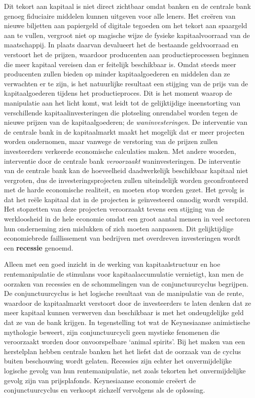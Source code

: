 \documentclass[
  a5paper,
  smalldemyvopaper,11pt,twoside,onecolumn,openright,extrafontsizes,
hidelinks]{memoir}
\begin{document}
Dit tekort aan kapitaal is niet direct zichtbaar omdat banken en de
centrale bank genoeg fiduciaire middelen kunnen uitgeven voor alle
leners. Het creëren van nieuwe biljetten aan papiergeld of digitale
tegoeden om het tekort aan spaargeld aan te vullen, vergroot niet op
magische wijze de fysieke kapitaalvoorraad van de maatschappij. In
plaats daarvan devalueert het de bestaande geldvoorraad en verstoort het
de prijzen, waardoor producenten aan productieprocessen beginnen die
meer kapitaal vereisen dan er feitelijk beschikbaar is. Omdat steeds
meer producenten zullen bieden op minder kapitaalgoederen en middelen
dan ze verwachten er te zijn, is het natuurlijke resultaat een stijging
van de prijs van de kapitaalgoederen tijdens het productieproces. Dit is
het moment waarop de manipulatie aan het licht komt, wat leidt tot de
gelijktijdige ineenstorting van verschillende kapitaalinvesteringen die
plotseling onrendabel worden tegen de nieuwe prijzen van de
kapitaalgoederen; de \emph{waninvesteringen}. De interventie van de
centrale bank in de kapitaalmarkt maakt het mogelijk dat er meer
projecten worden ondernomen, maar vanwege de verstoring van de prijzen
zullen investeerders verkeerde economische calculaties maken. Met andere
woorden, interventie door de centrale bank \emph{veroorzaakt}
waninvesteringen. De interventie van de centrale bank kan de hoeveelheid
daadwerkelijk beschikbaar kapitaal niet vergroten, dus de
investeringsprojecten zullen uiteindelijk worden geconfronteerd met de
harde economische realiteit, en moeten stop worden gezet. Het gevolg is
dat het reële kapitaal dat in de projecten is geïnvesteerd onnodig wordt
verspild. Het stopzetten van deze projecten veroorzaakt tevens een
stijging van de werkloosheid in de hele economie omdat een groot aantal
mensen in veel sectoren hun onderneming zien mislukken of zich moeten
aanpassen. Dit gelijktijdige economiebrede faillissement van bedrijven
met overdreven investeringen wordt een \textbf{recessie} genoemd.

Alleen met een goed inzicht in de werking van kapitaalstructuur en hoe
rentemanipulatie de stimulans voor kapitaalaccumulatie vernietigt, kan
men de oorzaken van recessies en de schommelingen van de
conjunctuurcyclus begrijpen. De conjunctuurcyclus is het logische
resultaat van de manipulatie van de rente, waardoor de kapitaalmarkt
verstoort door de investeerders te laten denken dat ze meer kapitaal
kunnen verwerven dan beschikbaar is met het ondeugdelijke geld dat ze
van de bank krijgen. In tegenstelling tot wat de Keynesiaanse
animistische mythologie beweert, zijn conjunctuurcycli geen mystieke
fenomenen die veroorzaakt worden door onvoorspelbare `animal spirits'.
Bij het maken van een herstelplan hebben centrale banken het het liefst
dat de oorzaak van de cyclus buiten beschouwing wordt gelaten. Recessies
zijn echter het onvermijdelijke logische gevolg van hun
rentemanipulatie, net zoals tekorten het onvermijdelijke gevolg zijn van
prijsplafonds. Keynesiaanse economie creëert de conjunctuurcyclus en
verkoopt zichzelf vervolgens als de oplossing.
\end{document}
